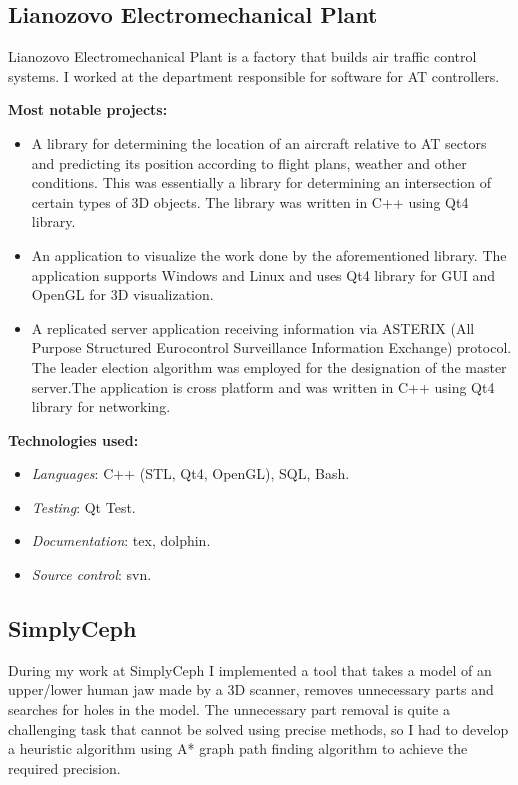 \documentclass[11pt,a4paper]{moderncv}
\begin{document}
\bigskip
\subsection{Lianozovo Electromechanical Plant}
  Lianozovo Electromechanical Plant is a factory that builds air traffic control systems. I worked at the department responsible for software for AT controllers.

  \medskip
  \textbf{Most notable projects:}
  \smallskip
  \begin{itemize}
    \item A library for determining the location of an aircraft relative to AT sectors and predicting its position according to flight plans, weather and other conditions.
      This was essentially a library for determining an intersection of certain types of 3D objects. The library was written in C++ using Qt4 library.
    \item An application to visualize the work done by the aforementioned library. The application supports Windows and Linux and uses Qt4 library for GUI and OpenGL for 3D visualization.
    \item A replicated server application receiving information via ASTERIX (All Purpose Structured Eurocontrol Surveillance Information Exchange) protocol.
      The leader election algorithm was employed for the designation of the master server.The application is cross platform and was written in C++ using Qt4 library for networking.
  \end{itemize}

  \medskip
  \textbf{Technologies used:}
  \smallskip
  \begin{itemize}
    \item \textit{Languages}: C++ (STL, Qt4, OpenGL), SQL, Bash.
    \item \textit{Testing}: Qt Test.
    \item \textit{Documentation}: tex, dolphin.
    \item \textit{Source control}: svn.
  \end{itemize}


\bigskip
\subsection{SimplyCeph}
  During my work at SimplyCeph I implemented a tool that takes a model of an upper/lower human jaw made by a 3D scanner, removes unnecessary parts and searches for holes in the model.
  The unnecessary part removal is quite a challenging task that cannot be solved using precise methods, so I had to develop a heuristic algorithm using A* graph path finding algorithm to achieve the required precision.
\end{document}
